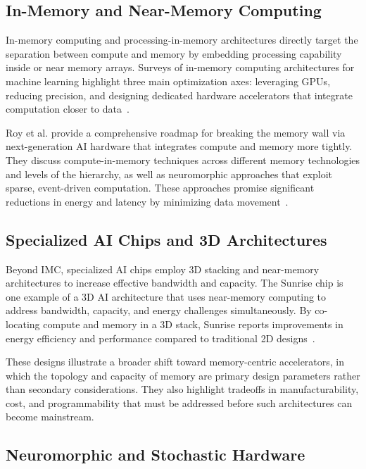 \documentclass[conference]{IEEEtran}
\begin{document}
\subsection{In-Memory and Near-Memory Computing}

In-memory computing and processing-in-memory architectures directly target the separation between compute and memory by embedding processing capability inside or near memory arrays. Surveys of in-memory computing architectures for machine learning highlight three main optimization axes: leveraging GPUs, reducing precision, and designing dedicated hardware accelerators that integrate computation closer to data~\cite{bavikadi2020review,snasel2024review}.

Roy et al. provide a comprehensive roadmap for breaking the memory wall via next-generation AI hardware that integrates compute and memory more tightly. They discuss compute-in-memory techniques across different memory technologies and levels of the hierarchy, as well as neuromorphic approaches that exploit sparse, event-driven computation. These approaches promise significant reductions in energy and latency by minimizing data movement~\cite{roy2025breaking}.

\subsection{Specialized AI Chips and 3D Architectures}

Beyond IMC, specialized AI chips employ 3D stacking and near-memory architectures to increase effective bandwidth and capacity. The Sunrise chip is one example of a 3D AI architecture that uses near-memory computing to address bandwidth, capacity, and energy challenges simultaneously. By co-locating compute and memory in a 3D stack, Sunrise reports improvements in energy efficiency and performance compared to traditional 2D designs~\cite{sunrise2020}.

These designs illustrate a broader shift toward memory-centric accelerators, in which the topology and capacity of memory are primary design parameters rather than secondary considerations. They also highlight tradeoffs in manufacturability, cost, and programmability that must be addressed before such architectures can become mainstream.

\subsection{Neuromorphic and Stochastic Hardware}
\end{document}
